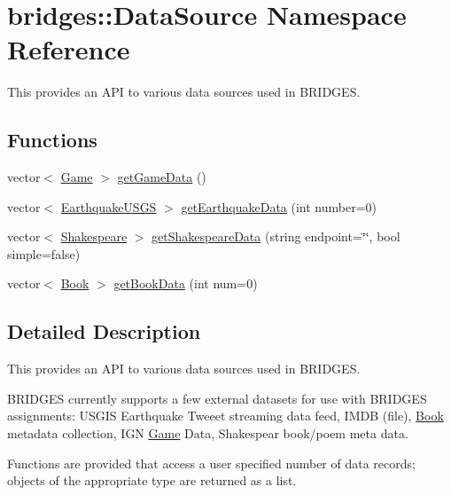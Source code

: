 \hypertarget{namespacebridges_1_1_data_source}{}\section{bridges\+:\+:Data\+Source Namespace Reference}
\label{namespacebridges_1_1_data_source}


This provides an A\+PI to various data sources used in B\+R\+I\+D\+G\+ES.  


\subsection*{Functions}
\begin{DoxyCompactItemize}
\item 
vector$<$ \hyperlink{classbridges_1_1_game}{Game} $>$ \hyperlink{namespacebridges_1_1_data_source_a96a28cc7f2a6013fe09b07cc53c7432f}{get\+Game\+Data} ()
\item 
vector$<$ \hyperlink{classbridges_1_1_earthquake_u_s_g_s}{Earthquake\+U\+S\+GS} $>$ \hyperlink{namespacebridges_1_1_data_source_a2af96553650d859b102f179b3db55389}{get\+Earthquake\+Data} (int number=0)
\item 
vector$<$ \hyperlink{classbridges_1_1_shakespeare}{Shakespeare} $>$ \hyperlink{namespacebridges_1_1_data_source_abdf2e4d709e9b7f1a5370726676d86ec}{get\+Shakespeare\+Data} (string endpoint=\char`\"{}\char`\"{}, bool simple=false)
\item 
vector$<$ \hyperlink{classbridges_1_1_book}{Book} $>$ \hyperlink{namespacebridges_1_1_data_source_aa7f1de628f3ad3309dbf89bd61108990}{get\+Book\+Data} (int num=0)
\end{DoxyCompactItemize}


\subsection{Detailed Description}
This provides an A\+PI to various data sources used in B\+R\+I\+D\+G\+ES. 

B\+R\+I\+D\+G\+ES currently supports a few external datasets for use with B\+R\+I\+D\+G\+ES assignments\+: U\+S\+G\+IS Earthquake Tweeet streaming data feed, I\+M\+DB (file), \hyperlink{classbridges_1_1_book}{Book} metadata collection, I\+GN \hyperlink{classbridges_1_1_game}{Game} Data, Shakespear book/poem meta data.

Functions are provided that access a user specified number of data records; objects of the appropriate type are returned as a list. 

